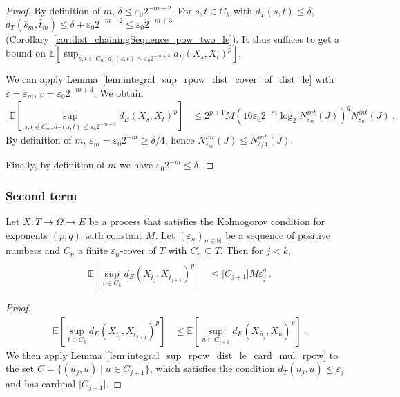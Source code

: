 \begin{proof}\leanok
By definition of $m$, $\delta \le \varepsilon_0 2^{-m+2}$.
For $s, t \in C_k$ with $d_T(s, t) \le \delta$, $d_T(\bar{s}_m, \bar{t}_m) \le \delta + \varepsilon_0 2^{-m+2} \le \varepsilon_0 2^{-m+3}$ (Corollary~\ref{cor:dist_chainingSequence_pow_two_le}).
It thus suffices to get a bound on $\mathbb{E} \left[ \sup_{s, t \in C_m; d_T(s, t) \le \varepsilon_0 2^{-m+3}} d_E(X_s, X_t)^p \right]$.

We can apply Lemma~\ref{lem:integral_sup_rpow_dist_cover_of_dist_le} with $\varepsilon = \varepsilon_m$, $c = \varepsilon_0 2^{-m+3}$. We obtain
\begin{align*}
  \mathbb{E} \left[ \sup_{s, t \in C_m; d_T(s, t) \le \varepsilon_0 2^{-m+3}} d_E(X_s, X_t)^p \right]
  &\le 2^{p+1} M \left(16 \varepsilon_0 2^{-m} \log_2 N^{int}_{\varepsilon_m}(J) \right)^q  N^{int}_{\varepsilon_m}(J)
  \: .
\end{align*}
By definition of $m$, $\varepsilon_m = \varepsilon_0 2^{-m} \ge \delta/4$,
hence $N^{int}_{\varepsilon_m}(J) \le N^{int}_{\delta / 4}(J)$.

Finally, by definition of $m$ we have $\varepsilon_0 2^{-m} \le \delta$.
\end{proof}



\subsubsection{Second term}


\begin{lemma}\label{lem:integral_sup_rpow_dist_succ}
  \leanok
Let $X : T \to \Omega \to E$ be a process that satisfies the Kolmogorov condition for exponents $(p,q)$ with constant $M$.
Let $(\varepsilon_n)_{n \in \mathbb{N}}$ be a sequence of positive numbers and $C_n$ a finite $\varepsilon_n$-cover of $T$ with $C_n \subseteq T$.
Then for $j < k$,
\begin{align*}
  \mathbb{E}\left[\sup_{t \in C_k} d_E(X_{\bar{t}_j}, X_{\bar{t}_{j+1}})^p \right]
  &\le \vert C_{j+1} \vert M \varepsilon_j^q
  \: .
\end{align*}
\end{lemma}

\begin{proof}\leanok
\begin{align*}
  \mathbb{E}\left[\sup_{t \in C_k} d_E(X_{\bar{t}_j}, X_{\bar{t}_{j+1}})^p \right]
  &\le \mathbb{E}\left[\sup_{u \in C_{j+1}} d_E(X_{\bar{u}_j}, X_{u})^p \right]
  \: .
\end{align*}
We then apply Lemma~\ref{lem:integral_sup_rpow_dist_le_card_mul_rpow} to the set $C = \{(\bar{u}_j, u) \mid u \in C_{j+1}\}$, which satisfies the condition $d_T(\bar{u}_j, u) \le \varepsilon_j$ and has cardinal $\vert C_{j+1} \vert$.
\end{proof}



